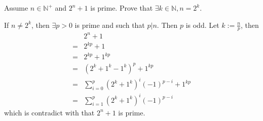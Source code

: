 \documentclass{ctexart}
\newif\ifpreface
\begin{document}
\large
\setlength{\baselineskip}{1.2em}
\ifpreface
  
  \newgeometry{left=2cm,right=2cm,top=2cm,bottom=2cm}
\else
  \maketitle
\fi
\begin{problem}\label{pro:p14.5}
  Assume \(n \in \mathbb{N}^+\) and \(2^n + 1\) is prime. Prove that \(\exists k \in \mathbb{N},n=2^k\).
\end{problem}
\begin{solution}
  If \(n \neq 2^k\), then \(\exists p>0 \) is prime and such that \(p | n\).
  Then \(p\) is odd. Let \(k:=\frac{n}{p}\), then
  \begin{equation}
    \begin{aligned}
        & 2^n+1                                      \\
      = & 2^{kp}+1                                   \\
      = & 2^{kp} + 1^{kp}                            \\
      = & (2^{k}+1^{k}-1^{k})^p+1^{kp}               \\
      = & \sum_{i=0}^p(2^k + 1^k)^i(-1)^{p-i}+1^{kp} \\
      = & \sum_{i=1}^p(2^k+1^k)^i(-1)^{p-i}
    \end{aligned}
  \end{equation}
  which is contradict with that \(2^n + 1\) is prime.
\end{solution}
\end{document}
